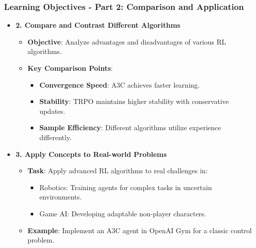 \documentclass{beamer}
\begin{document}
\begin{frame}[fragile]
    \frametitle{Learning Objectives - Part 2: Comparison and Application}
    \begin{itemize}
        \item \textbf{2. Compare and Contrast Different Algorithms}
        \begin{itemize}
            \item \textbf{Objective}: Analyze advantages and disadvantages of various RL algorithms.
            \item \textbf{Key Comparison Points}:
            \begin{itemize}
                \item \textbf{Convergence Speed}: A3C achieves faster learning.
                \item \textbf{Stability}: TRPO maintains higher stability with conservative updates.
                \item \textbf{Sample Efficiency}: Different algorithms utilize experience differently.
            \end{itemize}
        \end{itemize}
        
        \item \textbf{3. Apply Concepts to Real-world Problems}
        \begin{itemize}
            \item \textbf{Task}: Apply advanced RL algorithms to real challenges in:
            \begin{itemize}
                \item Robotics: Training agents for complex tasks in uncertain environments.
                \item Game AI: Developing adaptable non-player characters.
            \end{itemize}
            \item \textbf{Example}: Implement an A3C agent in OpenAI Gym for a classic control problem.
        \end{itemize}
    \end{itemize}
\end{frame}
\end{document}
